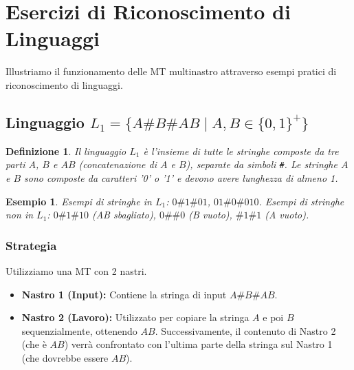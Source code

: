 \documentclass[a4paper, 11pt]{book} %
\newtheorem{definition}[theorem]{Definizione}
\newtheorem{example}[theorem]{Esempio}
\theoremstyle{definition}
\begin{document}
\section{Esercizi di Riconoscimento di Linguaggi}
Illustriamo il funzionamento delle MT multinastro attraverso esempi pratici di riconoscimento di linguaggi.

\subsection{Linguaggio $L_1 = \{A\#B\#AB \mid A,B \in \{0,1\}^+\}$}
\begin{definition}
Il linguaggio $L_1$ è l'insieme di tutte le stringhe composte da tre parti $A$, $B$ e $AB$ (concatenazione di $A$ e $B$), separate da simboli \texttt{\#}. Le stringhe $A$ e $B$ sono composte da caratteri '0' o '1' e devono avere lunghezza di almeno 1.
\end{definition}
\begin{example}
Esempi di stringhe in $L_1$: $0\texttt{\#}1\texttt{\#}01$, $01\texttt{\#}0\texttt{\#}010$.
Esempi di stringhe non in $L_1$: $0\texttt{\#}1\texttt{\#}10$ (AB sbagliato), $0\texttt{\#}\texttt{\#}0$ (B vuoto), $\texttt{\#}1\texttt{\#}1$ (A vuoto).
\end{example}

\subsubsection{Strategia}
Utilizziamo una MT con 2 nastri.
\begin{itemize}
    \item \textbf{Nastro 1 (Input):} Contiene la stringa di input $A\#B\#AB$.
    \item \textbf{Nastro 2 (Lavoro):} Utilizzato per copiare la stringa $A$ e poi $B$ sequenzialmente, ottenendo $AB$. Successivamente, il contenuto di Nastro 2 (che è $AB$) verrà confrontato con l'ultima parte della stringa sul Nastro 1 (che dovrebbe essere $AB$).
\end{itemize}
\end{document}
